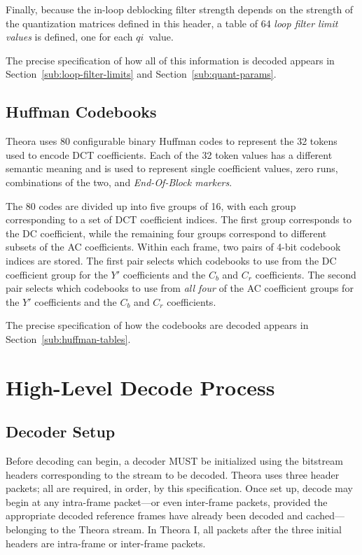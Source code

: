 \documentclass[9pt,letterpaper]{book}
\newcommand{\idx}[1]{{\ensuremath{\mathit{#1}}}}
\newcommand{\qi}{\idx{qi}}
\newcommand{\term}[1]{{\em #1}}
\numberwithin{equation}{chapter}
\numberwithin{figure}{chapter}
\numberwithin{table}{chapter}
\begin{document}
Finally, because the in-loop deblocking filter strength depends on the strength
 of the quantization matrices defined in this header, a table of 64 \term{loop
 filter limit values} is defined, one for each \qi\ value.

The precise specification of how all of this information is decoded appears in
 Section~\ref{sub:loop-filter-limits} and Section~\ref{sub:quant-params}.

\subsection{Huffman Codebooks}

Theora uses 80 configurable binary Huffman codes to represent the 32 tokens
 used to encode DCT coefficients.
Each of the 32 token values has a different semantic meaning and is used to
 represent single coefficient values, zero runs, combinations of the two, and
 \term{End-Of-Block markers}.

The 80 codes are divided up into five groups of 16, with each group
 corresponding to a set of DCT coefficient indices.
The first group corresponds to the DC coefficient, while the remaining four
 groups correspond to different subsets of the AC coefficients.
Within each frame, two pairs of 4-bit codebook indices are stored.
The first pair selects which codebooks to use from the DC coefficient group for
 the $Y'$ coefficients and the $C_b$ and $C_r$ coefficients.
The second pair selects which codebooks to use from {\em all four} of the AC
 coefficient groups for the $Y'$ coefficients and the $C_b$ and $C_r$
 coefficients.

The precise specification of how the codebooks are decoded appears in
 Section~\ref{sub:huffman-tables}.

\section{High-Level Decode Process}

\subsection{Decoder Setup}

Before decoding can begin, a decoder MUST be initialized using the bitstream
 headers corresponding to the stream to be decoded.
Theora uses three header packets; all are required, in order, by this
 specification.
Once set up, decode may begin at any intra-frame packet---or even inter-frame
 packets, provided the appropriate decoded reference frames have already been
 decoded and cached---belonging to the Theora stream.
In Theora I, all packets after the three initial headers are intra-frame or
 inter-frame packets.
\end{document}
